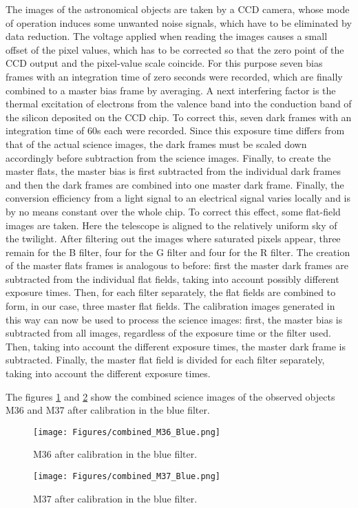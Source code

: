 \documentclass[fleqn,10pt]{SelfArx} %
\begin{document}
The images of the astronomical objects are taken by a CCD camera, whose mode of operation induces some unwanted noise signals, which have to be eliminated by data reduction. The voltage applied when reading the images causes a small offset of the pixel values, which has to be corrected so that the zero point of the CCD output and the pixel-value scale coincide. For this purpose seven bias frames with an integration time of zero seconds were recorded, which are finally combined to a master bias frame by averaging.
A next interfering factor is the thermal excitation of electrons from the valence band into the conduction band of the silicon deposited on the CCD chip. To correct this, seven dark frames with an integration time of 60s each were recorded. Since this exposure time differs from that of the actual science images, the dark frames must be scaled down accordingly before subtraction from the science images. Finally, to create the master flats, the master bias is first subtracted from the individual dark frames and then the dark frames are combined into one master dark frame.
Finally, the conversion efficiency from a light signal to an electrical signal varies locally and is by no means constant over the whole chip. To correct this effect, some flat-field images are taken. Here the telescope is aligned to the relatively uniform sky of the twilight. After filtering out the images where saturated pixels appear, three remain for the B filter, four for the G filter and four for the R filter. The creation of the master flats frames is analogous to before: first the master dark frames are subtracted from the individual flat fields, taking into account possibly different exposure times. Then, for each filter separately, the flat fields are combined to form, in our case, three master flat fields.
The calibration images generated in this way can now be used to process the science images: first, the master bias is subtracted from all images, regardless of the exposure time or the filter used. Then, taking into account the different exposure times, the master dark frame is subtracted. Finally, the master flat field is divided for each filter separately, taking into account the different exposure times.

The figures \ref{fig:combined_M36_Blue} and \ref{fig:combined_M37_Blue} show the combined science images of the observed objects M36 and M37 after calibration in the blue filter.

\begin{figure}
    \centering
    \texttt{[image: Figures/combined\_M36\_Blue.png]}
    \caption{M36 after calibration in the blue filter.}
    \label{fig:combined_M36_Blue}
\end{figure}
\begin{figure}
    \centering
    \texttt{[image: Figures/combined\_M37\_Blue.png]}
    \caption{M37 after calibration in the blue filter.}
    \label{fig:combined_M37_Blue}
\end{figure}
\end{document}

